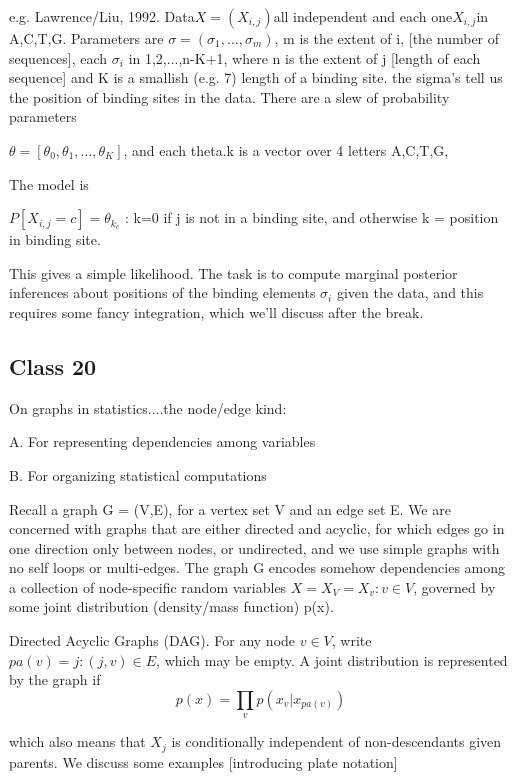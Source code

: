 \documentclass[11pt,a4paper]{article}
\begin{document}
	e.g. Lawrence/Liu, 1992.  Data$ X= (X_{i,j}) $all independent and each one$ X_{i,j} $in {A,C,T,G}.  Parameters are $\sigma=(\sigma_1,...,\sigma_m)$,  m is the extent of i, [the number of sequences], each $\sigma_i$ in {1,2,...,n-K+1}, where n is the extent of j [length of each sequence] and K is a smallish (e.g. 7) length of a binding site.  the sigma's tell us the position of binding sites in the data.  There are a slew of probability parameters
	
	$\theta = [ \theta_0, \theta_1,...,\theta_K]$, and each theta.k is a vector over 4 letters A,C,T,G,
	
	The model is 
	
	$P[ X_{i,j} = c ]  = \theta_{k_c}$   :   k=0 if j is not in a binding site, and otherwise k = position in binding site.
	
	This gives a simple likelihood.  The task is to compute marginal posterior inferences about positions of the binding elements $\sigma_i$ given the data, and this requires some fancy integration, which we'll discuss after the break.

\subsection*{Class 20}


On graphs in statistics....the node/edge kind:

A.  For representing dependencies among variables

B. For organizing statistical computations

Recall a graph G = (V,E), for a vertex set V and an edge set E.  We are concerned with graphs that are either directed and acyclic, for which edges go in one direction only between nodes, or undirected, and we use simple graphs with no self loops or multi-edges.  The graph G encodes somehow dependencies among a collection of node-specific random variables $X = X_V = { X_v: v \in V }$, governed by some joint distribution (density/mass function) p(x).

Directed Acyclic Graphs (DAG).  For any node $v \in V$, write $pa(v) = { j:  (j,v) \in E }$, which may be empty.  A joint distribution is represented by the graph if
\begin{equation}
p(x) = \prod_v  p( x_v | x_{pa(v)} )
\end{equation}

	
	which also means that $X_j$ is conditionally independent of non-descendants given parents.   We discuss some examples  [introducing plate notation]
	
\end{document}
